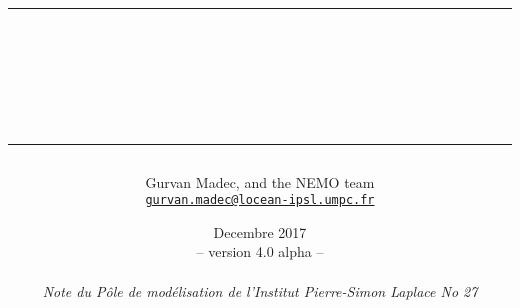 \documentclass[a4paper, 11pt]{book}
\begin{document}


\title{
\vspace{ 1.4cm}\rule{345pt}{1.5pt}													\\
\vspace{0.45cm}{\Huge NEMO ocean engine}											\\
\rule{345pt}{1.5pt}
}

\author{
\Large Gurvan Madec, and the NEMO team					                                             \\
\texttt{\small\href{mailto:gurvan.madec@locean-ipsl.umpc.fr}{gurvan.madec@locean-ipsl.umpc.fr}}	\\
}

\date{
Decembre 2017																											\\
{\small  -- version 4.0 alpha --}																				\\
~																															\\
\textit{\small Note du P\^ole de mod\'{e}lisation de l'Institut Pierre-Simon Laplace No 27 }	\\
\vspace{0.45cm}{ ISSN No 1288-1619.}
}

\maketitle
\frontmatter



\dominitoc
\tableofcontents



\mainmatter












\end{document}
